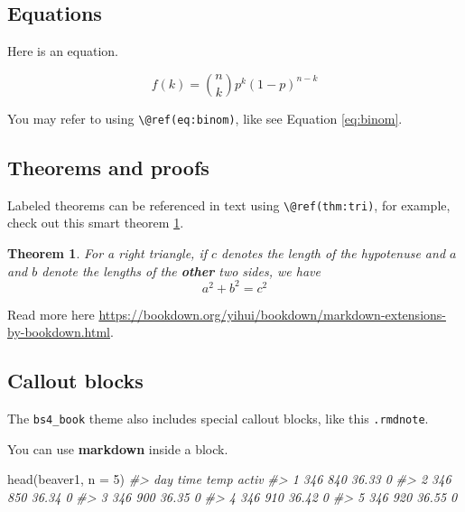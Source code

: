 \documentclass[
]{book}
\newenvironment{Shaded}{\begin{snugshade}}{\end{snugshade}}
\newcommand{\AttributeTok}[1]{\textcolor[rgb]{0.77,0.63,0.00}{#1}}
\newcommand{\CommentTok}[1]{\textcolor[rgb]{0.56,0.35,0.01}{\textit{#1}}}
\newcommand{\DecValTok}[1]{\textcolor[rgb]{0.00,0.00,0.81}{#1}}
\newcommand{\FunctionTok}[1]{\textcolor[rgb]{0.00,0.00,0.00}{#1}}
\newcommand{\NormalTok}[1]{#1}
\newtheorem{theorem}{Theorem}[chapter]
\theoremstyle{definition}
\theoremstyle{definition}
\theoremstyle{definition}
\theoremstyle{definition}
\theoremstyle{remark}
\begin{document}
\hypertarget{equations}{%
\subsection{Equations}\label{equations}}

Here is an equation.

\begin{equation} 
  f\left(k\right) = \binom{n}{k} p^k\left(1-p\right)^{n-k}
  \label{eq:binom}
\end{equation}

You may refer to using \texttt{\textbackslash{}@ref(eq:binom)}, like see Equation \eqref{eq:binom}.

\hypertarget{theorems-and-proofs}{%
\subsection{Theorems and proofs}\label{theorems-and-proofs}}

Labeled theorems can be referenced in text using \texttt{\textbackslash{}@ref(thm:tri)}, for example, check out this smart theorem \ref{thm:tri}.

\begin{theorem}
\protect\hypertarget{thm:tri}{}\label{thm:tri}For a right triangle, if \(c\) denotes the \emph{length} of the hypotenuse
and \(a\) and \(b\) denote the lengths of the \textbf{other} two sides, we have
\[a^2 + b^2 = c^2\]
\end{theorem}

Read more here \url{https://bookdown.org/yihui/bookdown/markdown-extensions-by-bookdown.html}.

\hypertarget{callout-blocks}{%
\subsection{Callout blocks}\label{callout-blocks}}

The \texttt{bs4\_book} theme also includes special callout blocks, like this \texttt{.rmdnote}.

You can use \textbf{markdown} inside a block.

\begin{Shaded}
\begin{Highlighting}[]
\FunctionTok{head}\NormalTok{(beaver1, }\AttributeTok{n =} \DecValTok{5}\NormalTok{)}
\CommentTok{\#\textgreater{}   day time  temp activ}
\CommentTok{\#\textgreater{} 1 346  840 36.33     0}
\CommentTok{\#\textgreater{} 2 346  850 36.34     0}
\CommentTok{\#\textgreater{} 3 346  900 36.35     0}
\CommentTok{\#\textgreater{} 4 346  910 36.42     0}
\CommentTok{\#\textgreater{} 5 346  920 36.55     0}
\end{Highlighting}
\end{Shaded}
\end{document}

